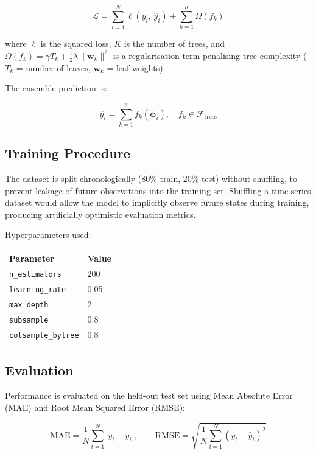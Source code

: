 \documentclass[12pt,a4paper]{article}
\begin{document}
\[
  \mathcal{L} = \sum_{i=1}^{N} \ell\!\left(y_i,\, \hat{y}_i\right) + \sum_{k=1}^{K} \Omega(f_k)
\]

where $\ell$ is the squared loss, $K$ is the number of trees, and $\Omega(f_k) = \gamma T_k + \frac{1}{2}\lambda \|\mathbf{w}_k\|^2$ is a regularisation term penalising tree complexity ($T_k$ = number of leaves, $\mathbf{w}_k$ = leaf weights).

The ensemble prediction is:

\[
  \hat{y}_i = \sum_{k=1}^{K} f_k(\boldsymbol{\phi}_i), \quad f_k \in \mathcal{F}_{\text{trees}}
\]

\subsection{Training Procedure}

The dataset is split chronologically (80\% train, 20\% test) without shuffling, to prevent leakage of future observations into the training set. Shuffling a time series dataset would allow the model to implicitly observe future states during training, producing artificially optimistic evaluation metrics.

Hyperparameters used:

\begin{center}
  \begin{tabular}{ll}
    \toprule
    Parameter & Value \\
    \midrule
    \texttt{n\_estimators} & 200 \\
    \texttt{learning\_rate} & 0.05 \\
    \texttt{max\_depth} & 2 \\
    \texttt{subsample} & 0.8 \\
    \texttt{colsample\_bytree} & 0.8 \\
    \bottomrule
  \end{tabular}
\end{center}

\subsection{Evaluation}

Performance is evaluated on the held-out test set using Mean Absolute Error (MAE) and Root Mean Squared Error (RMSE):

\[
  \text{MAE} = \frac{1}{N}\sum_{i=1}^{N} |y_i - \hat{y}_i|, \qquad
  \text{RMSE} = \sqrt{\frac{1}{N}\sum_{i=1}^{N}(y_i - \hat{y}_i)^2}
\]
\end{document}
